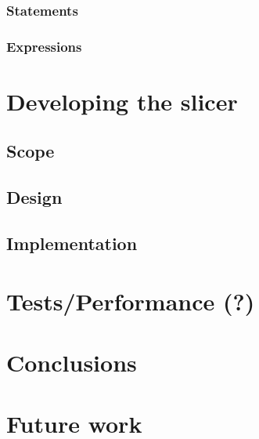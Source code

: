 \documentclass[a4paper]{article}
\begin{document}
\subsubsection{Statements}

\subsubsection{Expressions}

\section{Developing the slicer}

\subsection{Scope}

\subsection{Design}

\subsection{Implementation}

\section{Tests/Performance (?)}

\section{Conclusions}

\section{Future work}

\newpage


\end{document}
